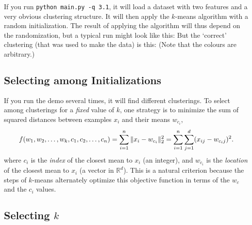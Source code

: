 \documentclass{article}
\begin{document}
If you run \verb|python main.py -q 3.1|, it will load a dataset with two features and a very obvious clustering structure. It will then apply the $k$-means algorithm with a random initialization. The result of applying the algorithm will thus depend on the randomization, but a typical run might look like this:
But the `correct' clustering (that was used to make the data) is this:
(Note that the colours are arbitrary.)

\subsection{Selecting among Initializations}

If you run the demo several times, it will find different clusterings. To select among clusterings for a \emph{fixed} value of $k$, one strategy is to minimize the sum of squared distances between examples $x_i$ and their means $w_{c_i}$,
\[
f(w_1,w_2,\dots,w_k,c_1,c_2,\dots,c_n) = \sum_{i=1}^n \|x_i - w_{c_i}\|_2^2 = \sum_{i=1}^n \sum_{j=1}^d (x_{ij} - w_{c_ij})^2.
\]
 where $c_i$ is the \emph{index} of the closest mean to $x_i$ (an integer), and $w_{c_i}$ is the \emph{location} of the closest mean to $x_i$ (a vector in $\mathbb{R}^d$). This is a natural criterion because the steps of $k$-means alternately optimize this objective function in terms of the $w_c$ and the $c_i$ values.



 \subsection{Selecting $k$}
\end{document}
